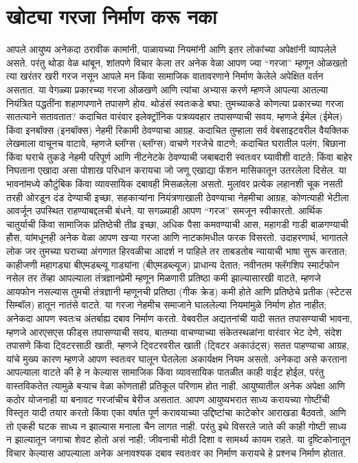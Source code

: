 \chapter{खोट्या गरजा निर्माण करू नका}
आपले आयुष्य अनेकदा ठरावीक कामांनी, पाळायच्या नियमांनी आणि इतर लोकांच्या अपेक्षांनी व्यापलेले असते. परंतु थोडा वेळ थांबून, शांतपणे विचार केला तर अनेक वेळा आपण ज्या “गरजा” म्हणून ओळखतो त्या खरंतर खरी गरज नसून आपले मन किंवा सामाजिक वातावरणाने निर्माण केलेले अपेक्षित वर्तन असतात. या वेगळ्या प्रकारच्या गरजा ओळखणे आणि त्यांचा अभ्यास करणे म्हणजे आपल्या आतल्या नियंत्रित पद्धतींना शहाणपणाने तपासणे होय.
थोडंसं स्वतःकडे बघा: तुमच्याकडे कोणत्या प्रकारच्या गरजा सातत्याने सतावतात? कदाचित वारंवार इलेक्ट्रॉनिक पत्रव्यवहार तपासण्याची सवय, म्हणजे ईमेल (ईमेल) किंवा इनबॉक्स (इनबॉक्स) नेहमी रिकामी ठेवण्याचा आग्रह. कदाचित तुम्हाला सर्व वेबसाइटवरील वैयक्तिक लेखमाला वाचूनच वाटावे, म्हणजे ब्लॉग्स (ब्लॉग्स) वाचणे गरजेचे वाटणे; कदाचित घरातील पलंग, बिछाना किंवा घराचे तुकडे नेहमी परिपूर्ण आणि नीटनेटके ठेवण्याची जबाबदारी स्वतःवर घ्यावीशी वाटते; किंवा बाहेर निघताना एखादा असा पोशाख परिधान करायचा जो जणू एखाद्या फॅशन मासिकातून उतरलेला दिसेल.
या भावनांमध्ये कौटुंबिक किंवा व्यावसायिक दबावही मिसळलेला असतो. मुलांवर प्रत्येक लहानशी चूक नसती तरही ओरडून दंड देण्याची इच्छा, सहकाऱ्यांना नियंत्रणाखाली ठेवण्याचा नेहमीचा आग्रह, कोणत्याही भेटीला आवर्जून उपस्थित राहण्याबद्दलची बंधने, या सगळ्याही आपण “गरज” समजून स्वीकारतो. आर्थिक चातुर्याची किंवा सामाजिक प्रतिष्ठेची तीव्र इच्छा, अधिक पैसा कमवण्याची आस, महागडी गाडी बाळगण्याची हौस, यांमधूनही अनेक वेळा आपण खऱ्या गरजा आणि नाटकांमधील फरक विसरतो. उदाहरणार्थ, भागातले लोक जर तुमच्या घराच्या अंगणात हिरवळीचा आदर्श न पाहिले तर ताबडतोब न्यायाची भाषा सुरू करतात; काहीजणी महागड्या बीएमडब्ल्यू गाड्यांना (बीएमडब्ल्यूज) प्राधान्य देतात; नवीनतम फ्लॅगशिप स्मार्टफोन नसेल तर तेंव्हा आपल्याला तंत्रज्ञानप्रेमी म्हणून मिळणारी प्रतिष्ठा कमी झाल्यासारखी वाटते, म्हणजे आयफोन नसल्यास तुमची तंत्रज्ञानी म्हणूनची प्रतिष्ठा (गीक क्रेड) कमी होते आणि प्रतिष्ठेचे प्रतीक (स्टेटस सिम्बॉल) हातून नातंसे वाटते.
या गरजा नेहमीच समाजाने घाललेल्या नियमांमुळे निर्माण होत नाहीत; अनेकदा आपण स्वतःच अंतर्बाह्य दबाव निर्माण करतो. वेबवरील अद्यतनांची यादी सतत तपासण्याची भावना, म्हणजे आरएसएस फीड्स तपासण्याची सवय, बातम्या वाचण्याच्या संकेतस्थळांना वारंवार भेट देणे, संदेश तपासणे किंवा ट्विटरसाठी खाती,  म्हणजे ट्विटरवरील खाती (ट्विटर अकाउंट्स) सतत पाहण्याचा आग्रह, यांचे मुख्य कारण म्हणजे आपण स्वतःवर घालून घेतलेला अकार्यक्षम नियम असतो. अनेकदा असे करताना आपल्याला वाटते की हे न केल्यास सामाजिक किंवा व्यावसायिक पातळीत काही वाईट होईल, परंतु वास्तविकतेत त्यामुळे बर्‍याच वेळा कोणताही प्रतिकूल परिणाम होत नाही.
आयुष्यातील अनेक अपेक्षा आणि कठोर योजनाही या बनावट गरजांचीच बेरीज असतात. आपण आयुष्यभरात साध्य करायच्या गोष्टींची विस्तृत यादी तयार करतो किंवा एका वर्षात पूर्ण करावयाच्या उद्दिष्टांचा काटेकोर आराखडा बैठवतो, आणि तो एकही घटक साध्य न झाल्यास मनाला चैन लागत नाही. परंतु इथे विसरले जाते की काही गोष्टी साध्य न झाल्यातून जगाचा शेवट होतो असं नाही; जीवनाची मोठी दिशा व सामर्थ्य कायम राहते. या दृष्टिकोनातून विचार केल्यास आपल्याला अनेक अनावश्यक दबाव स्वतःवर का निर्माण करायचे हे प्रश्नच निर्माण होतात.

